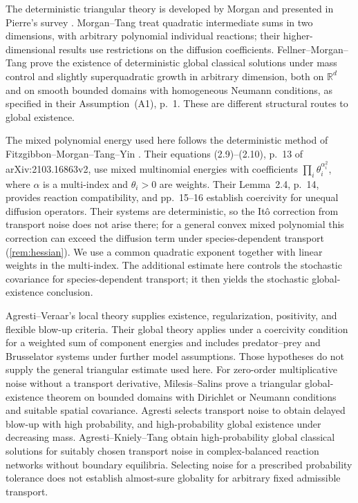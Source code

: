 \documentclass[11pt]{amsart}
\theoremstyle{definition}
\newcommand{\R}{\mathbb R}
\numberwithin{equation}{section}
\begin{document}
The deterministic triangular theory is developed by Morgan
\cite{Morgan89,Morgan90} and presented in Pierre's survey
\cite[Theorem~3.5]{Pierre}. Morgan--Tang
\cite[Theorem~1.1, p.~4 of the arXiv text]{MT} treat quadratic
intermediate sums in two dimensions, with arbitrary polynomial individual
reactions; their higher-dimensional results use restrictions on the
diffusion coefficients. Fellner--Morgan--Tang
\cite[Theorem~1.1, p.~2]{FMT} prove the existence of deterministic global classical
solutions under mass control and slightly superquadratic growth in
arbitrary dimension, both on $\R^d$ and on smooth bounded domains with
homogeneous Neumann conditions, as specified in their Assumption~(A1),
p.~1. These are different structural routes to global existence.

The mixed polynomial energy used here follows the deterministic method of
Fitzgibbon--Morgan--Tang--Yin \cite{FMTY}. Their equations (2.9)--(2.10),
p.~13 of arXiv:2103.16863v2, use mixed multinomial energies with
coefficients $\prod_i\theta_i^{\alpha_i^2}$, where $\alpha$ is a
multi-index and $\theta_i>0$ are weights. Their Lemma~2.4, p.~14,
provides reaction compatibility, and pp.~15--16 establish coercivity for
unequal diffusion operators. Their systems are deterministic, so the
It\^o correction from transport noise does not arise there; for a general
convex mixed polynomial this correction can exceed the diffusion term
under species-dependent transport (\cref{rem:hessian}). We use a common quadratic exponent together
with linear weights in the multi-index. The additional estimate here
controls the stochastic covariance for species-dependent transport; it
then yields the stochastic global-existence conclusion.

Agresti--Veraar's local theory \cite{AVlocal} supplies existence,
regularization, positivity, and flexible blow-up criteria. Their global
theory \cite[Assumption~3.1 and Theorem~3.2, p.~10]{AVglobal} applies
under a coercivity condition for a weighted sum of component energies and includes
predator--prey and Brusselator systems under further model assumptions.
Those hypotheses do not supply the general triangular estimate used
here. For zero-order multiplicative noise without a transport derivative,
Milesis--Salins \cite[Theorem~5.2, p.~31]{MS} prove a triangular
global-existence theorem on bounded domains with Dirichlet or Neumann
conditions and suitable spatial covariance. Agresti
\cite[Theorems~3.5--3.6, pp.~12--13]{Agresti} selects transport noise
to obtain delayed blow-up with high probability, and high-probability
global existence under decreasing mass. Agresti--Kniely--Tang
\cite[Theorem~3.4, p.~15]{AKT} obtain high-probability global classical
solutions for suitably chosen transport noise in complex-balanced
reaction networks without boundary equilibria. Selecting noise for a
prescribed probability tolerance does not establish almost-sure
globality for arbitrary fixed admissible transport.
\end{document}
